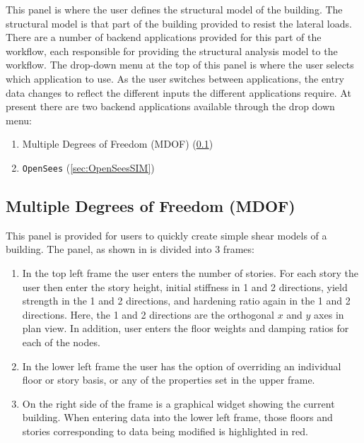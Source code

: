 This panel is where the user defines the structural model of the
building. The structural model is that part of the building provided
to resist the lateral loads. There are a number of backend
applications provided for this part of the workflow, each responsible
for providing the structural analysis model to the workflow. The
drop-down menu at the top of this panel is where the user selects
which application to use. As the user switches between applications,
the entry data changes to reflect the different inputs the different
applications require. At present there are two backend applications
available through the drop down menu: 

\begin{enumerate}
\item Multiple Degrees of Freedom (MDOF) (\ref{sec:MDOF})
\item \texttt{OpenSees} (\ref{sec:OpenSeesSIM})
\end{enumerate}

\subsection{Multiple Degrees of Freedom (MDOF)}\label{sec:MDOF}

This panel is provided for users to quickly create simple shear models
of a building. The panel, as shown in  is divided
into 3 frames:
\begin{enumerate}
\item In the top left frame the user enters the number of stories. For
  each story the user then enter the story height, initial stiffness in
  1 and 2 directions, yield strength in the 1 and 2 directions, and
  hardening ratio again in the 1 and 2 directions. Here, the 1 and 2 directions
  are the orthogonal $x$ and $y$ axes in plan view. In addition, user enters
  the floor weights and damping ratios for each of the nodes.
\item In the lower left frame the user has the option of overriding an
  individual floor or story basis, or any of the properties set in the
  upper frame.
\item On the right side of the frame is a graphical widget showing the
  current building. When entering data into the lower left frame,
  those floors and stories corresponding to data being modified is
  highlighted in red.
\end{enumerate}

